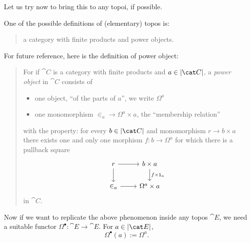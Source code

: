 Let us try now to bring this to any topoi, if possible.

\begin{sandbox}
One of the possible definitions of (elementary) topos is:
\begin{quotation}
a category with finite products and power objects. 
\end{quotation}
For future reference, here is the definition of power object:
\begin{quotation}
For if \(\cat C\) is a category with finite products and \(a \in \abs{\cat C}\), a {\em power object} in \(\cat C\) consists of
\begin{itemize}
\item one object, \enquote{of the parts of \(a\)}, we write \(\Omega^a\)
\item one monomorphism \(\in_a \to \Omega^a \times a\), the \enquote{membership relation}
\end{itemize}
with the property: for every \(b \in \abs{\cat C}\) and monomorphism \(r \to b \times a\) there exists one and only one morphism \(f : b \to \Omega^a\) for which there is a pullback square
\[\begin{tikzcd}
r \ar[r] \ar[d] & b \times a  \ar["{f \times \id_a}", d]\\
\in_a \ar[r]    & \Omega^a \times a
\end{tikzcd}\]
in \(\cat C\).
\end{quotation}
Now if we want to replicate the above phenomenon inside any topos \(\cat E\), we need a suitable functor \(\Omega^\bullet : \cat E \to \cat E\). For \(a \in \abs{\cat E}\),
\[\Omega^\bullet (a) := \Omega^a .\]

\end{sandbox}
